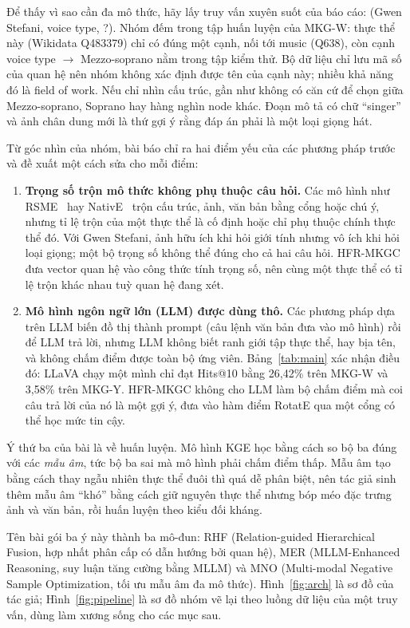 \documentclass[conference,a4paper]{IEEEtran}
\begin{document}
Để thấy vì sao cần đa mô thức, hãy lấy truy vấn xuyên suốt của báo cáo: (Gwen Stefani, voice type, ?). Nhóm đếm trong tập huấn luyện của MKG-W: thực thể này (Wikidata Q483379) chỉ có đúng một cạnh, nối tới music (Q638), còn cạnh voice type $\to$ Mezzo-soprano nằm trong tập kiểm thử. Bộ dữ liệu chỉ lưu mã số của quan hệ nên nhóm không xác định được tên của cạnh này; nhiều khả năng đó là field of work. Nếu chỉ nhìn cấu trúc, gần như không có căn cứ để chọn giữa Mezzo-soprano, Soprano hay hàng nghìn node khác. Đoạn mô tả có chữ ``singer'' và ảnh chân dung mới là thứ gợi ý rằng đáp án phải là một loại giọng hát.

Từ góc nhìn của nhóm, bài báo chỉ ra hai điểm yếu của các phương pháp trước và đề xuất một cách sửa cho mỗi điểm:

\begin{enumerate}
\item \textbf{Trọng số trộn mô thức không phụ thuộc câu hỏi.} Các mô hình như RSME~\cite{rsme} hay NativE~\cite{native} trộn cấu trúc, ảnh, văn bản bằng cổng hoặc chú ý, nhưng tỉ lệ trộn của một thực thể là cố định hoặc chỉ phụ thuộc chính thực thể đó. Với Gwen Stefani, ảnh hữu ích khi hỏi giới tính nhưng vô ích khi hỏi loại giọng; một bộ trọng số không thể đúng cho cả hai câu hỏi. HFR-MKGC đưa vector quan hệ vào công thức tính trọng số, nên cùng một thực thể có tỉ lệ trộn khác nhau tuỳ quan hệ đang xét.
\item \textbf{Mô hình ngôn ngữ lớn (LLM) được dùng thô.} Các phương pháp dựa trên LLM biến đồ thị thành prompt (câu lệnh văn bản đưa vào mô hình) rồi để LLM trả lời, nhưng LLM không biết ranh giới tập thực thể, hay bịa tên, và không chấm điểm được toàn bộ ứng viên. Bảng~\ref{tab:main} xác nhận điều đó: LLaVA chạy một mình chỉ đạt Hits@10 bằng 26{,}42\% trên MKG-W và 3{,}58\% trên MKG-Y. HFR-MKGC không cho LLM làm bộ chấm điểm mà coi câu trả lời của nó là một gợi ý, đưa vào hàm điểm RotatE qua một cổng có thể học mức tin cậy.
\end{enumerate}

Ý thứ ba của bài là về huấn luyện. Mô hình KGE học bằng cách so bộ ba đúng với các \emph{mẫu âm}, tức bộ ba sai mà mô hình phải chấm điểm thấp. Mẫu âm tạo bằng cách thay ngẫu nhiên thực thể đuôi thì quá dễ phân biệt, nên tác giả sinh thêm mẫu âm ``khó'' bằng cách giữ nguyên thực thể nhưng bóp méo đặc trưng ảnh và văn bản, rồi huấn luyện theo kiểu đối kháng.

Tên bài gói ba ý này thành ba mô-đun: RHF (Relation-guided Hierarchical Fusion, hợp nhất phân cấp có dẫn hướng bởi quan hệ), MER (MLLM-Enhanced Reasoning, suy luận tăng cường bằng MLLM) và MNO (Multi-modal Negative Sample Optimization, tối ưu mẫu âm đa mô thức). Hình~\ref{fig:arch} là sơ đồ của tác giả; Hình~\ref{fig:pipeline} là sơ đồ nhóm vẽ lại theo luồng dữ liệu của một truy vấn, dùng làm xương sống cho các mục sau.
\end{document}
